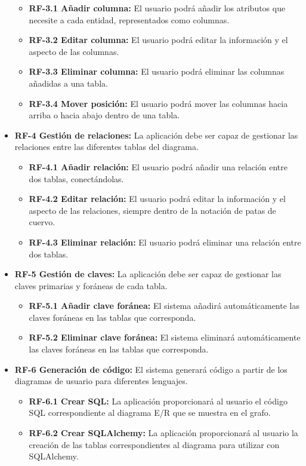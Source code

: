 \begin{itemize}
    \begin{itemize}
        \item \textbf{RF-3.1 Añadir columna: }El usuario podrá añadir los atributos que necesite a cada entidad, representados como columnas.
        \item \textbf{RF-3.2 Editar columna: }El usuario podrá editar la información y el aspecto de las columnas.
        \item \textbf{RF-3.3 Eliminar columna: }El usuario podrá eliminar las columnas añadidas a una tabla.
        \item \textbf{RF-3.4 Mover posición: }El usuario podrá mover las columnas hacia arriba o hacia abajo dentro de una tabla.
    \end{itemize}
    \item \textbf{RF-4 Gestión de relaciones: }La aplicación debe ser capaz de gestionar las relaciones entre las diferentes tablas del diagrama.
    \begin{itemize}
        \item \textbf{RF-4.1 Añadir relación: }El usuario podrá añadir una relación entre dos tablas, conectándolas.
        \item \textbf{RF-4.2 Editar relación: }El usuario podrá editar la información y el aspecto de las relaciones, siempre dentro de la notación de patas de cuervo.
        \item \textbf{RF-4.3 Eliminar relación: }El usuario podrá eliminar una relación entre dos tablas.
    \end{itemize}
    \item \textbf{RF-5 Gestión de claves: }La aplicación debe ser capaz de gestionar las claves primarias y foráneas de cada tabla.
    \begin{itemize}
        \item \textbf{RF-5.1 Añadir clave foránea: }El sistema añadirá automáticamente las claves foráneas en las tablas que corresponda.
        \item \textbf{RF-5.2 Eliminar clave foránea: }El sistema eliminará automáticamente las claves foráneas en las tablas que corresponda.
    \end{itemize}
    \item \textbf{RF-6 Generación de código: }El sistema generará código a partir de los diagramas de usuario para diferentes lenguajes.
    \begin{itemize}
        \item \textbf{RF-6.1 Crear SQL: }La aplicación proporcionará al usuario el código SQL correspondiente al diagrama E/R que se muestra en el grafo.
        \item \textbf{RF-6.2 Crear SQLAlchemy: }La aplicación proporcionará al usuario la creación de las tablas correspondientes al diagrama para utilizar con SQLAlchemy.
    \end{itemize}
\end{itemize}


